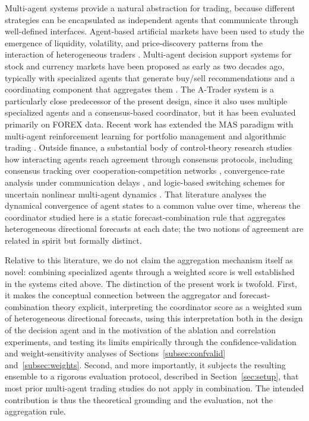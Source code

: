 \documentclass{ieeeaccess}
\begin{document}
Multi-agent systems provide a natural abstraction for trading, because different strategies can be encapsulated as independent agents that communicate through well-defined interfaces. Agent-based artificial markets have been used to study the emergence of liquidity, volatility, and price-discovery patterns from the interaction of heterogeneous traders \cite{lebaron2011,8675280}. Multi-agent decision support systems for stock and currency markets have been proposed as early as two decades ago, typically with specialized agents that generate buy/sell recommendations and a coordinating component that aggregates them \cite{luo2002,korczak2013,hernes2016,hernes2024}. The A-Trader system \cite{korczak2013,hernes2016} is a particularly close predecessor of the present design, since it also uses multiple specialized agents and a consensus-based coordinator, but it has been evaluated primarily on FOREX data. Recent work has extended the MAS paradigm with multi-agent reinforcement learning for portfolio management \cite{huang2022} and algorithmic trading \cite{shavandi2022}. Outside finance, a substantial body of control-theory research studies how interacting agents reach agreement through consensus protocols, including consensus tracking over cooperation-competition networks \cite{li2025consensus}, convergence-rate analysis under communication delays \cite{shi2025consensus}, and logic-based switching schemes for uncertain nonlinear multi-agent dynamics \cite{fan2025}. That literature analyses the dynamical convergence of agent states to a common value over time, whereas the coordinator studied here is a static forecast-combination rule that aggregates heterogeneous directional forecasts at each date; the two notions of agreement are related in spirit but formally distinct.

Relative to this literature, we do not claim the aggregation mechanism itself as novel: combining specialized agents through a weighted score is well established in the systems cited above. The distinction of the present work is twofold. First, it makes the conceptual connection between the aggregator and forecast-combination theory \cite{batesgranger1969,clemen1989,timmermann2006} explicit, interpreting the coordinator score as a weighted sum of heterogeneous directional forecasts, using this interpretation both in the design of the decision agent and in the motivation of the ablation and correlation experiments, and testing its limits empirically through the confidence-validation and weight-sensitivity analyses of Sections~\ref{subsec:confvalid} and~\ref{subsec:weights}. Second, and more importantly, it subjects the resulting ensemble to a rigorous evaluation protocol, described in Section~\ref{sec:setup}, that most prior multi-agent trading studies do not apply in combination. The intended contribution is thus the theoretical grounding and the evaluation, not the aggregation rule.
\end{document}
